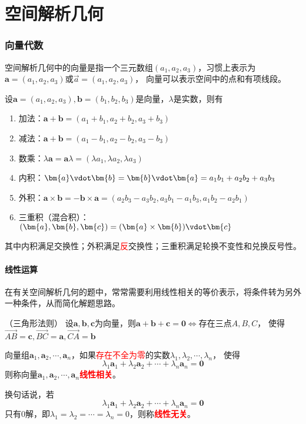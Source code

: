 \part{空间解析几何}
\section{向量代数}
空间解析几何中的向量是指一个三元数组$(a_1,a_2,a_3)$，习惯上表示为$\bm{a}=(a_1,a_2,a_3 )$或$\vec{a}=(a_1,a_2,a_3)$，
向量可以表示空间中的点和有项线段。

\begin{definition}
    设$\bm{a} = (a_1,a_2,a_3),\bm{b} = (b_1,b_2,b_3)$是向量，$\lambda$是实数，则有
    \begin{enumerate}[(1)]
        \item 加法：$\bm{a}+\bm{b} = (a_1+b_1,a_2+b_2,a_3+b_3)$
        \item 减法：$\bm{a}+\bm{b} = (a_1-b_1,a_2-b_2,a_3-b_3)$
        \item 数乘：$\lambda\bm{a} = \bm{a}\lambda = (\lambda a_1, \lambda a_2, \lambda a_3)$
        \item 内积：$\bm{a}\vdot\bm{b} = \bm{b}\vdot\bm{a} = a_1b_1+a_2b_2+a_3b_3$
        \item 外积：$\bm{a}\times\bm{b} = -\bm{b}\times\bm{a} = (a_2b_3-a_3b_2, a_3b_1-a_1b_3, a_1b_2-a_2b_1)$
        \item 三重积（混合积）：$(\bm{a},\bm{b},\bm{c}) = (\bm{a}\times\bm{b})\vdot\bm{c}$
    \end{enumerate}
\end{definition}
其中内积满足交换性；外积满足\textcolor{red}{反}交换性；三重积满足轮换不变性和兑换反号性。
\subsection{线性运算}
在有关空间解析几何的题中，常常需要利用线性相关的等价表示，将条件转为另外一种条件，从而简化解题思路。
\begin{theorem}
    （三角形法则）
    \label{th:三角形法则}
    设$\bm{a},\bm{b},\bm{c}$为向量，则$\bm{a}+\bm{b}+\bm{c}=\bm{0}\iff$存在三点$A,B,C$，
    使得$\overrightarrow{AB}=\bm{c},\overrightarrow{BC}=\bm{a},\overrightarrow{CA}=\bm{b}$
\end{theorem}

\begin{definition}
    向量组$\bm{a}_1,\bm{a}_2,\cdots,\bm{a}_n$，如果\textcolor{red}{存在不全为零}的实数$\lambda_1,\lambda_2,\cdots,\lambda_n$，
    使得
    \[ \lambda_1\bm{a}_1 + \lambda_2\bm{a}_2 + \cdots + \lambda_n\bm{a}_n = \bm{0} \]
    则称向量$\bm{a}_1,\bm{a}_2,\cdots,\bm{a}_n$\textcolor{red}{\textbf{\textsf{线性相关}}}。

    换句话说，若
    \[ \lambda_1\bm{a}_1 + \lambda_2\bm{a}_2 + \cdots + \lambda_n\bm{a}_n = \bm{0} \]
    只有$0$解，即$\lambda_1 = \lambda_2 = \cdots = \lambda_n = 0$，则称\textcolor{red}{\textbf{\textsf{线性无关}}}。
\end{definition}

